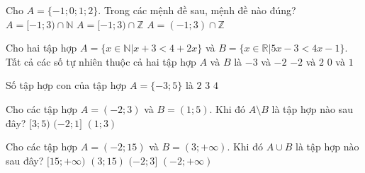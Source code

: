 \begin{ex}%
	Cho $A=\lbrace -1;0;1;2 \rbrace$. Trong các mệnh đề sau, mệnh đề nào đúng?
	\choice{$A=[-1;3)\cap \mathbb{N^*} $}
	{$A=[-1;3)\cap \mathbb{N} $}
	{\True $A=[-1;3)\cap \mathbb{Z} $}
	{$A=(-1;3) \cap \mathbb{Z} $}
	\loigiai{Ta có $\mathbb{N^*}=\{1,2,3,4,\ldots\}$.
		\begin{itemize}
			\item $[-1;3)\cap \mathbb{N^*}=\{1;2\}$.
			\item $[-1;3)\cap \mathbb{N}=\{0;1;2\}$.
			\item $[-1;3)\cap \mathbb{Z}=\{-1;0;1;2\}$.
			\item $(-1;3) \cap \mathbb{Z}=\{0;1;2\}$.
		\end{itemize}
		Vậy $A=[-1;3)\cap \mathbb{Z} $.
	}
\end{ex}

\begin{ex}%
	Cho hai tập hợp $A=\lbrace x \in \mathbb{N}\big| x+3<4+2x \rbrace$ và $B= \lbrace x \in \mathbb{R} \big| 5x-3 < 4x-1  \rbrace$. Tất cả các số tự nhiên thuộc cả hai tập hợp $A$ và $B$ là
	{$-3$ và $-2$}
	{$-2$ và $2$}
	{\True $0$ và $1$}
\end{ex}
\begin{ex}%
	Số tập hợp con của tập hợp $A=\lbrace -3; 5 \rbrace$ là
	{$2$}
	{$3 $}
	{\True $4 $}
\end{ex}

\begin{ex}%
	Cho các tập hợp $A=(-2;3)$ và $B=(1;5)$. Khi đó $A \setminus B$ là tập hợp nào sau đây?
	{$[3;5)$}
	{\True $(-2;1]$}
	{$(1;3)$}
	\loigiai{$A \setminus B=(-2;3)\setminus (1;5)=(-2;1]$.
	}
\end{ex}
\begin{ex}%
	Cho các tập hợp $A=(-2;15)$ và  $B=(3;+ \infty )$. Khi đó $A \cup B$ là tập hợp nào sau đây?
	\choice
	{$[15;+\infty ) $}
	{$(3;15) $}
	{$(-2;3] $}
	{\True $(-2;+ \infty ) $}
\end{ex}

